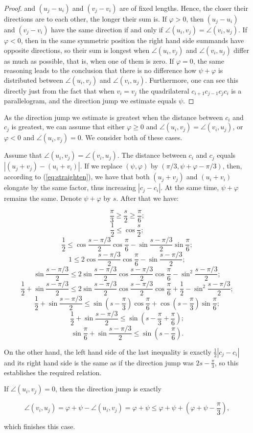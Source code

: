 \begin{appendices}
\begin{proof}
and $(u_j - u_i)$ and $(v_j - v_i)$ are of fixed lengths. Hence, the closer their directions are to each other, the longer their sum is. If $\varphi > 0$, then $(u_j - u_i)$ and $(v_j - v_i)$ have the same direction if and only if $\angle(u_i, v_j) = \angle(v_i, u_j)$. If $\varphi < 0$, then in the same symmetric position the right hand side summands have opposite directions, so their sum is longest when $\angle(u_i, v_j)$ and $\angle(v_i, u_j)$ differ as much as possible, that is, when one of them is zero. If $\varphi = 0$, the same reasoning leads to the conclusion that there is no difference how $\psi + \varphi$ is distributed between $\angle(u_i, v_j)$ and $\angle(v_i, u_j)$. Furthermore, one can see this directly just from the fact that when $v_i = v_j$ the quadrilateral $c_{i+1}c_{j-1}c_jc_i$ is a parallelogram, and the direction jump we estimate equals $\psi$.
\end{proof}

As the direction jump we estimate is greatest when the distance between $c_i$ and $c_j$ is greatest, we can assume that either $\varphi\geq 0$ and $\angle(u_i, v_j) = \angle(v_i, u_j)$, or $\varphi < 0$ and $\angle(u_i, v_j) = 0$. We consider both of these cases.

Assume that $\angle(u_i, v_j) = \angle(v_i, u_j)$. The distance between $c_i$ and $c_j$ equals $|(u_j + v_j) - (u_i + v_i)|$. If we replace $(\psi, \varphi)$ by $(\pi/3, \psi + \varphi - \pi/3)$, then, according to (\ref{eq:straighten}), we have that both $(u_j + v_j)$ and $(u_i + v_i)$ elongate by the same factor, thus increasing $|c_j - c_i|$. At the same time, $\psi + \varphi$ remains the same. Denote $\psi + \varphi$ by $s$. After that we have:

$$\frac{\pi}{3} \geq \frac{s}{2} \geq\frac{\pi}{6};$$
$$\frac12 \leq \cos\frac{s}{2};$$
$$\frac12 \leq \cos\frac{s - \pi/3}{2}\cos\frac{\pi}{6} - \sin\frac{s - \pi/3}{2}\sin\frac{\pi}{6};$$
$$1 \leq 2\cos\frac{s - \pi/3}{2}\cos\frac{\pi}{6} - \sin\frac{s - \pi/3}{2};$$
$$\sin\frac{s - \pi/3}{2} \leq 2\sin\frac{s - \pi/3}{2}\cos\frac{s - \pi/3}{2}\cos\frac{\pi}{6} - \sin^2\frac{s - \pi/3}{2};$$
$$\frac12 + \sin\frac{s - \pi/3}{2} \leq 2\sin\frac{s - \pi/3}{2}\cos\frac{s - \pi/3}{2}\cos\frac{\pi}{6} + \frac12 - \sin^2\frac{s - \pi/3}{2};$$
$$\frac12 + \sin\frac{s - \pi/3}{2} \leq \sin\left(s - \frac{\pi}{3}\right)\cos\frac{\pi}{6} + \cos\left(s - \frac{\pi}{3}\right)\sin\frac{\pi}{6};$$
$$\frac12 + \sin\frac{s - \pi/3}{2} \leq \sin\left(s - \frac{\pi}{3} + \frac{\pi}{6}\right);$$
$$\sin\frac{\pi}{6} + \sin\frac{s - \pi/3}{2} \leq \sin\left(s - \frac{\pi}{6}\right).$$

On the other hand, the left hand side of the last inequality is exactly $\frac12|c_j - c_i|$ and its right hand side is the same as if the direction jump was $2s - \frac{\pi}{3}$, so this establishes the required relation.

If $\angle(u_i, v_j) = 0$, then the direction jump is exactly

$$\angle(v_i, u_j) = \varphi + \psi - \angle(u_i, v_j) = \varphi + \psi \leq \varphi + \psi + \left(\varphi + \psi - \frac{\pi}{3}\right),$$

which finishes this case.

\end{appendices}
